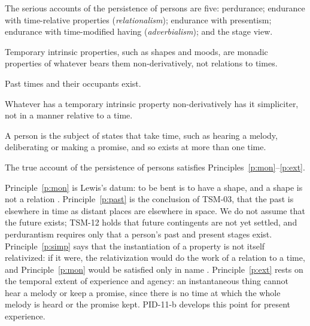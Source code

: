 \documentclass{situationist-preprint}
\begin{document}
\begin{assumption}\label{a:exh}
The serious accounts of the persistence of persons are five: perdurance; endurance with time-relative properties (\emph{relationalism}); endurance with presentism; endurance with time-modified having (\emph{adverbialism}); and the stage view.
\end{assumption}

\begin{principle}\label{p:mon}
Temporary intrinsic properties, such as shapes and moods, are monadic properties of whatever bears them non-derivatively, not relations to times.
\end{principle}

\begin{principle}\label{p:past}
Past times and their occupants exist.
\end{principle}

\begin{principle}\label{p:simp}
Whatever has a temporary intrinsic property non-derivatively has it simpliciter, not in a manner relative to a time.
\end{principle}

\begin{principle}\label{p:ext}
A person is the subject of states that take time, such as hearing a melody, deliberating or making a promise, and so exists at more than one time.
\end{principle}

\begin{assumption}\label{a:adeq}
The true account of the persistence of persons satisfies Principles~\ref{p:mon}--\ref{p:ext}.
\end{assumption}

Principle~\ref{p:mon} is Lewis's datum: to be bent is to have a shape, and a shape is not a relation \citep{Lewis1986}. Principle~\ref{p:past} is the conclusion of TSM-03, that the past is elsewhere in time as distant places are elsewhere in space. We do not assume that the future exists; TSM-12 holds that future contingents are not yet settled, and perdurantism requires only that a person's past and present stages exist. Principle~\ref{p:simp} says that the instantiation of a property is not itself relativized: if it were, the relativization would do the work of a relation to a time, and Principle~\ref{p:mon} would be satisfied only in name \citep{Lewis2002}. Principle~\ref{p:ext} rests on the temporal extent of experience and agency: an instantaneous thing cannot hear a melody or keep a promise, since there is no time at which the whole melody is heard or the promise kept. PID-11-b develops this point for present experience.
\end{document}
